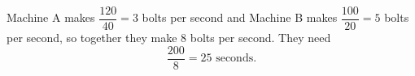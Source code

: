 Machine A makes $\dfrac{120}{40}=3$ bolts per second and Machine B makes $\dfrac{100}{20}=5$ bolts per second, so together they make $8$ bolts per second. They need
\[
\dfrac{200}{8}=\boxed{25}\text{ seconds}.
\]
